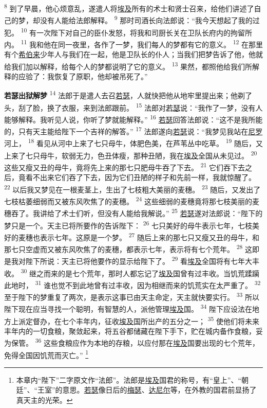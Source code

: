 \textsuperscript{8}
到了早晨，他心烦意乱，遂遣人将\uline{埃及}所有的术士和贤士召来，给他们讲述了自己的梦，却没有人能给法郎解释。
\textsuperscript{9}
那时司酒长向法郎说：“我今天想起了我的过犯。
\textsuperscript{10}
有一次陛下对自己的臣仆发怒，将我和司厨长关在卫队长府内的拘留所内。
\textsuperscript{11}
我和他在同一夜里，各作了一梦，我们每人的梦都有它的意义。
\textsuperscript{12}
在那里有个\uline{希伯来}少年人与我们在一起，他是卫队长的仆人；当我们把梦告诉了他，他就给我们加以解释，给每个人的梦都说明了它的意义。
\textsuperscript{13}
果然，都照他给我们所解释的应验了：我恢复了原职，他却被吊死了。”

\textbf{若瑟出狱解梦\quad}
\textsuperscript{14}
法郎于是遣人去召\uline{若瑟}，人就快把他从地牢里提出来；他剃了头，刮了脸，换了衣服，来到法郎跟前。
\textsuperscript{15}
法郎对\uline{若瑟}说：“我作了一梦，没有人能够解释。我听见人说，你听了梦就能解释。”
\textsuperscript{16}
\uline{若瑟}回答法郎说：“这不是我所能的，只有天主能给陛下一个吉祥的解答。”
\textsuperscript{17}
法郎遂向\uline{若瑟}说：“我梦见我站在\uline{尼罗}河上，
\textsuperscript{18}
看见从河中上来了七只母牛，体肥色美，在芦苇丛中吃草。
\textsuperscript{19}
随后，又上来了七只母牛，软弱无力，色丑体瘦，那种丑陋，我在\uline{埃及}全国从未见过。
\textsuperscript{20}
这些又瘦又丑的母牛，竟将先上来的那七只肥母牛吞了下去。
\textsuperscript{21}
它们吞下去之后，竟看不出来它们吞了下去，因为它们丑陋的样子和先前一样，我就惊醒了。
\textsuperscript{22}
以后我又梦见在一根麦茎上，生出了七枝粗大美丽的麦穗。
\textsuperscript{23}
随后，又发出了七枝枯萎细弱而又被东风吹焦了的麦穗。
\textsuperscript{24}
这些细弱的麦穗竟将那七枝美丽的麦穗吞了。我讲给了术士们听，但没有人能给我解说。”
\textsuperscript{25}
\uline{若瑟}遂对法郎说：“陛下的梦只是一个。天主已将所要作的告诉陛下：
\textsuperscript{26}
七只美好的母牛表示七年，七枝美好的麦穗也表示七年。这原是一个梦。
\textsuperscript{27}
随后上来的那七只又瘦又丑的母牛，和那七只空虚而又被东风吹焦了的麦穗，都表示七年，表示将有七个荒年。
\textsuperscript{28}
这即是我对陛下所说：天主已将他要作的显示给陛下了。
\textsuperscript{29}
看\uline{埃及}全国将有七年大丰收。
\textsuperscript{30}
继之而来的是七个荒年，那时人都忘记了\uline{埃及}国曾有过丰收。当饥荒蹂躏此地时，
\textsuperscript{31}
谁也觉不到此地曾有过丰收，因为相继而来的饥荒实在太严重了。
\textsuperscript{32}
至于陛下的梦重复了两次，是表示这事已由天主命定，天主就快要实行。
\textsuperscript{33}
所以陛下现在应当寻找一个聪明，有智慧的人，派他管理\uline{埃及}国。
\textsuperscript{34}
陛下应设法在地方上派定督办，在七个丰年内，征收\uline{埃及}国所出产的五分之一；
\textsuperscript{35}
使他们将未来丰年内的一切食粮，聚敛起来，将五谷都储藏在陛下手下，贮在城内备作食粮，妥为保管。
\textsuperscript{36}
这些食粮应作为本地的存粮，以应付那在\uline{埃及}国要出现的七个荒年，免得全国因饥荒而灭亡。”
\footnote{本章内“陛下”二字原文作“法郎”。法郎是\uline{埃及}国君的称号，有“皇上”、“朝廷”、“王室”的意思。\uline{若瑟}像日后的\uline{梅瑟}、\uline{达尼尔}等，在外教的国君前显扬了真天主的光荣。}

